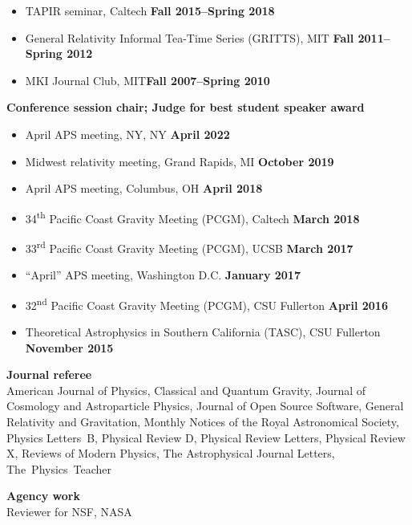 \documentclass[margin,line]{res}
\begin{document}
\begin{resume}
\vspace*{.05in}
\begin{itemize}
\item[] TAPIR seminar, Caltech\hfill
  {\bf Fall 2015--Spring 2018}
\item[] General Relativity Informal Tea-Time Series (GRITTS), MIT\hfill
  {\bf Fall 2011--Spring 2012}
\item[] MKI Journal Club, MIT\hfill {\bf Fall 2007--Spring 2010}
\end{itemize}
{\bf Conference session chair; Judge for best student speaker award}
\vspace*{.05in}
\begin{itemize}
\item[]
April APS meeting, NY, NY
\hfill {\bf April 2022}
\item[]
Midwest relativity meeting, Grand Rapids, MI
\hfill {\bf October 2019}
\item[]
April APS meeting, Columbus, OH
\hfill {\bf April 2018}
\item[]
34\textsuperscript{th} Pacific Coast Gravity Meeting (PCGM),
Caltech
\hfill {\bf March 2018}
\item[]
33\textsuperscript{rd} Pacific Coast Gravity Meeting (PCGM),
UCSB
\hfill {\bf March 2017}
\item[]
``April'' APS meeting, Washington D.C.
\hfill {\bf January 2017}
\item[]
32\textsuperscript{nd} Pacific Coast Gravity Meeting (PCGM),
CSU Fullerton
\hfill {\bf April 2016}
\item[]
Theoretical Astrophysics in Southern California (TASC),
CSU Fullerton
\hfill {\bf November 2015}
\end{itemize}

{\bf Journal referee}
\vspace*{.05in}\\
\hspace*{1em}
American Journal of Physics,
Classical and Quantum Gravity,
Journal of Cosmology and Astroparticle Physics,
Journal of Open Source Software,
General Relativity and Gravitation,
Monthly Notices of the Royal Astronomical Society,
Physics Letters~B,
Physical Review D,
Physical Review Letters,
Physical Review X,
Reviews of Modern Physics,
The Astrophysical Journal Letters,
The~Physics~Teacher

{\bf Agency work}
\vspace*{.05in}\\
\hspace*{1em}
Reviewer for NSF, NASA


\end{resume}
\end{document}

